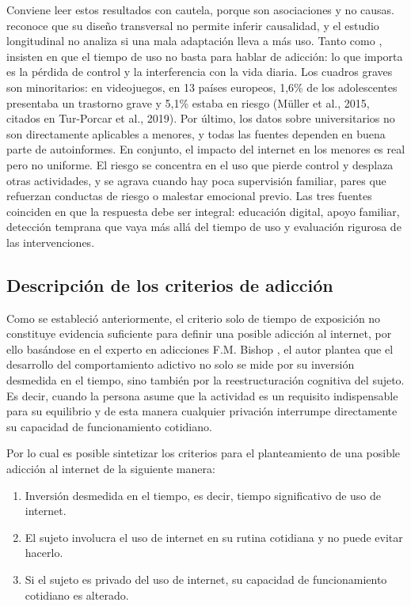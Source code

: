 \documentclass[10pt,letterpaper]{article}
\begin{document}
Conviene leer estos resultados con cautela, porque son asociaciones y no causas. \citep{eficacia_academica} reconoce que su diseño transversal no permite inferir causalidad, y el estudio longitudinal no analiza si una mala adaptación lleva a más uso. Tanto \citep{mobile_addiction} como \citep{dadi2024adolescents}, insisten en que el tiempo de uso no basta para hablar de adicción: lo que importa es la pérdida de control y la interferencia con la vida diaria. Los cuadros graves son minoritarios: en videojuegos, en 13 países europeos, 1,6\% de los adolescentes presentaba un trastorno grave y 5,1\% estaba en riesgo (Müller et al., 2015, citados en Tur-Porcar et al., 2019). Por último, los datos sobre universitarios no son directamente aplicables a menores, y todas las fuentes dependen en buena parte de autoinformes.
En conjunto, el impacto del internet en los menores es real pero no uniforme. El riesgo se concentra en el uso que pierde control y desplaza otras actividades, y se agrava cuando hay poca supervisión familiar, pares que refuerzan conductas de riesgo o malestar emocional previo. Las tres fuentes coinciden en que la respuesta debe ser integral: educación digital, apoyo familiar, detección temprana que vaya más allá del tiempo de uso y evaluación rigurosa de las intervenciones.

\subsection{Descripción de los criterios de adicción}
Como se estableció anteriormente, el criterio solo de tiempo de exposición no constituye evidencia suficiente para definir una posible adicción al internet, por ello basándose en el experto en adicciones F.M. Bishop \citep{bishopaddictions}, el autor plantea que el desarrollo del comportamiento adictivo no solo se mide por su inversión desmedida en el tiempo, sino también por la reestructuración cognitiva del sujeto. Es decir, cuando la persona asume que la actividad es un requisito indispensable para su equilibrio y de esta manera cualquier privación interrumpe directamente su capacidad de funcionamiento cotidiano.

Por lo cual es posible sintetizar los criterios para el planteamiento de una posible adicción al internet de la siguiente manera:


\begin{enumerate}
\item Inversión desmedida en el tiempo, es decir, tiempo significativo de uso de internet.
\item El sujeto involucra el uso de internet en su rutina cotidiana y no puede evitar hacerlo.
\item Si el sujeto es privado del uso de internet, su capacidad de funcionamiento cotidiano es alterado.
\end{enumerate}
\end{document}
